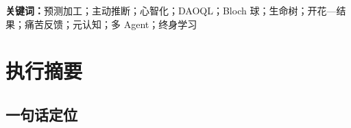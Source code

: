 \documentclass[UTF8,a4paper,11pt]{ctexart}
\begin{document}
\begin{abstract}
Tender 试图回答一个问题：当知识、答案与一般问题求解能力越来越容易获得，教育系统还能为一个人的一生提供什么？本白皮书给出的答案是：提供一套持续理解、校准并支持心智成长的环境，让每个人能够形成自己的价值证据、选择值得追求的问题、承担真实后果，并在需要时获得恰到好处的帮助。

项目以预测加工理论与心智化理论作为当前的核心认知框架。人不是被动接收信息的容器，而是在有限感官与行动能力下，用生成模型预测世界、通过预测误差修正模型，并通过行动改变世界。人与世界的交往主要沿预测加工回路展开；人与人的交往则还需要心智化回路：推断他人的信念、情绪、意图和视角，并意识到自己的推断可能错误。学习是生命树内部结构与能力的生长；开花是生命树向外部世界表达、提问、教学、协作、试验和创作；结果是不同外界交互所产生的分化后果。本文进一步把痛苦视为一种高权重反馈：它可能来自探索后的边界、错配、责任代价或伤害，因此必须区分可转化的困难与需要保护、退出和求助的伤害。内倾、外倾、大五、MBTI 与荣格八维被作为早期行为先验，用来在缺乏长期数据时初始化支持方式，随后由真实生长、开花与结果持续覆盖。语言层只负责从话语中提取可观察证据片段和候选假设，不能直接决定知识掌握、人格或临床结论；语言模型、Tender 状态融合、答题结果与真实行动必须分开记录。产品采用“一套核心、三类交付界面”：B 端可以由 Tender 提供完整教育系统，也可以嵌入合作方原有教育系统；C 端由 Tender 提供自己的界面，并融入用户生活。Tender 因此把系统分为客观世界、有限接触面、主观体验和 Agent 支持四类边界：DAOQL 是世界性质的事件存储，可不断从黑盒 API 与异构数据源提取事实；Bloch 球表示人类实际能够接触和测量的有限客观环境；Agent Bridge 负责把客观事件翻译成可更正的主观体验；生命树树冠由功能脑区式的体验分区构成，其他专家 Agent 作为环绕树冠的“天使”提供支持。

白皮书同时披露当前实现与证据：数据库快照包含 10,613 个事件、1,976 条因果与来源边、916 个身份、155 个主观体验节点和 107 个体验摘要；长期合成验证覆盖 8 个学习者、每人 8 轮、跨 12 周；自动测试 93 项。本文严格区分“系统已能运行”“在教育理论上合理”“已有真人因果证据”三种状态。Tender 的下一阶段不是继续堆叠功能，而是把预测误差、精度、元认知校准、行动恢复和创造迁移转化为预注册的实证研究。
\end{abstract}

\noindent\textbf{关键词：}预测加工；主动推断；心智化；DAOQL；Bloch 球；生命树；开花—结果；痛苦反馈；元认知；多 Agent；终身学习

\newpage
\section{执行摘要}

\subsection{一句话定位}
\end{document}
